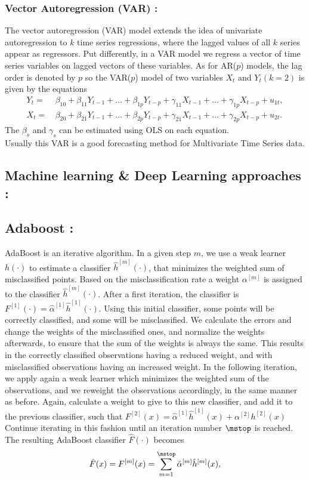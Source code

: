 \subsubsection{Vector Autoregression (VAR) : }
The vector autoregression (VAR) model extends the idea of univariate autoregression to $k$ time series regressions, where the lagged values of all $k$ series appear as regressors. Put differently, in a VAR model we regress a vector of time series variables on lagged vectors of these variables. As for AR($p$) models, the lag order is denoted by $p$ so the VAR($p$) model of two variables $X_{t}$ and $Y_{t}(k=2)$ is given by the equations  
\begin{align*}
  Y_t =& \, \beta_{10} + \beta_{11} Y_{t-1} + \dots + \beta_{1p} Y_{t-p} + \gamma_{11} X_{t-1} + \dots + \gamma_{1p} X_{t-p} + u_{1t}, \\
  X_t =& \, \beta_{20} + \beta_{21} Y_{t-1} + \dots + \beta_{2p} Y_{t-p} + \gamma_{21} X_{t-1} + \dots + \gamma_{2p} X_{t-p} + u_{2t}.
\end{align*}
The $\beta_{s}$ and  $\gamma_{s}$ can be estimated using OLS on each equation.\\Usually this VAR is a good forecasting method for Multivariate Time Series data.

\subsection{Machine learning \& Deep Learning approaches :}


\subsection{Adaboost :}


AdaBoost \cite{adaboost}is an iterative algorithm.
In a given step $m$, we use a weak learner $h(\cdot)$ to estimate a classifier $\hat{h}^{[m]}(\cdot)$, that minimizes the weighted sum of misclassified points.
Based on the misclassification rate a weight $\alpha^{[m]}$ is assigned to the classifier $\hat{h}^{[m]}(\cdot)$.
After a first iteration, the classifier is $F^{[1]}(\cdot)=\hat{\alpha}^{[1]}\hat{h}^{[1]}(\cdot)$.
Using this initial classifier, some points will be correctly classified, and some will be misclassified.
We calculate the errors and change the weights of the misclassified ones, and normalize the weights afterwards, to ensure that the sum of the weights is always the same.
This results in the correctly classified observations having a reduced weight, and with misclassified observations having an increased weight.
In the following iteration, we apply again a weak learner which minimizes the weighted sum of the observations, and we reweight the observations accordingly, in the same manner as before.
Again, calculate a weight to give to this new classifier, and add it to the previous classifier, such that $F^{[2]}(x)=\hat{\alpha}^{[1]}\hat{h}^{[1]}(x)+\alpha^{[2]}h^{[2]}(x)$
Continue iterating in this fashion until an iteration number $\mstop$ is reached.
The resulting AdaBoost classifier $\hat{F}(\cdot)$ becomes
\begin{equation*}
    \hat{F}(x)=F^{[m]}(x)=\sum_{m=1}^{\mstop}\hat{\alpha}^{[m]}\hat{h}^{[m]}(x),
\end{equation*}

